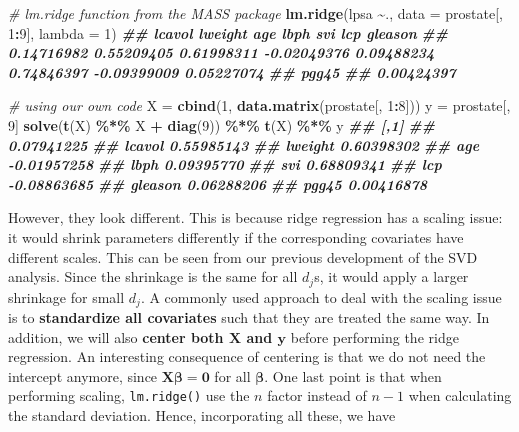 \documentclass[
]{book}
\newenvironment{Shaded}{\begin{snugshade}}{\end{snugshade}}
\newcommand{\AttributeTok}[1]{\textcolor[rgb]{0.13,0.29,0.53}{#1}}
\newcommand{\CommentTok}[1]{\textcolor[rgb]{0.56,0.35,0.01}{\textit{#1}}}
\newcommand{\DecValTok}[1]{\textcolor[rgb]{0.00,0.00,0.81}{#1}}
\newcommand{\DocumentationTok}[1]{\textcolor[rgb]{0.56,0.35,0.01}{\textbf{\textit{#1}}}}
\newcommand{\FunctionTok}[1]{\textcolor[rgb]{0.13,0.29,0.53}{\textbf{#1}}}
\newcommand{\NormalTok}[1]{#1}
\newcommand{\OtherTok}[1]{\textcolor[rgb]{0.56,0.35,0.01}{#1}}
\newcommand{\SpecialCharTok}[1]{\textcolor[rgb]{0.81,0.36,0.00}{\textbf{#1}}}
\theoremstyle{definition}
\theoremstyle{definition}
\theoremstyle{definition}
\theoremstyle{definition}
\theoremstyle{remark}
\begin{document}
\begin{Shaded}
\begin{Highlighting}[]
  \CommentTok{\# lm.ridge function from the MASS package}
  \FunctionTok{lm.ridge}\NormalTok{(lpsa }\SpecialCharTok{\textasciitilde{}}\NormalTok{., }\AttributeTok{data =}\NormalTok{ prostate[, }\DecValTok{1}\SpecialCharTok{:}\DecValTok{9}\NormalTok{], }\AttributeTok{lambda =} \DecValTok{1}\NormalTok{)}
\DocumentationTok{\#\#                  lcavol     lweight         age        lbph         svi         lcp     gleason }
\DocumentationTok{\#\#  0.14716982  0.55209405  0.61998311 {-}0.02049376  0.09488234  0.74846397 {-}0.09399009  0.05227074 }
\DocumentationTok{\#\#       pgg45 }
\DocumentationTok{\#\#  0.00424397}

  \CommentTok{\# using our own code}
\NormalTok{  X }\OtherTok{=} \FunctionTok{cbind}\NormalTok{(}\DecValTok{1}\NormalTok{, }\FunctionTok{data.matrix}\NormalTok{(prostate[, }\DecValTok{1}\SpecialCharTok{:}\DecValTok{8}\NormalTok{]))}
\NormalTok{  y }\OtherTok{=}\NormalTok{ prostate[, }\DecValTok{9}\NormalTok{]}
  \FunctionTok{solve}\NormalTok{(}\FunctionTok{t}\NormalTok{(X) }\SpecialCharTok{\%*\%}\NormalTok{ X }\SpecialCharTok{+} \FunctionTok{diag}\NormalTok{(}\DecValTok{9}\NormalTok{)) }\SpecialCharTok{\%*\%} \FunctionTok{t}\NormalTok{(X) }\SpecialCharTok{\%*\%}\NormalTok{ y}
\DocumentationTok{\#\#                [,1]}
\DocumentationTok{\#\#          0.07941225}
\DocumentationTok{\#\# lcavol   0.55985143}
\DocumentationTok{\#\# lweight  0.60398302}
\DocumentationTok{\#\# age     {-}0.01957258}
\DocumentationTok{\#\# lbph     0.09395770}
\DocumentationTok{\#\# svi      0.68809341}
\DocumentationTok{\#\# lcp     {-}0.08863685}
\DocumentationTok{\#\# gleason  0.06288206}
\DocumentationTok{\#\# pgg45    0.00416878}
\end{Highlighting}
\end{Shaded}

However, they look different. This is because ridge regression has a scaling issue: it would shrink parameters differently if the corresponding covariates have different scales. This can be seen from our previous development of the SVD analysis. Since the shrinkage is the same for all \(d_j\)s, it would apply a larger shrinkage for small \(d_j\). A commonly used approach to deal with the scaling issue is to \textbf{standardize all covariates} such that they are treated the same way. In addition, we will also \textbf{center both \(\mathbf{X}\) and \(\mathbf{y}\)} before performing the ridge regression. An interesting consequence of centering is that we do not need the intercept anymore, since \(\mathbf{X}\boldsymbol \beta= \mathbf{0}\) for all \(\boldsymbol \beta\). One last point is that when performing scaling, \texttt{lm.ridge()} use the \(n\) factor instead of \(n-1\) when calculating the standard deviation. Hence, incorporating all these, we have
\end{document}
